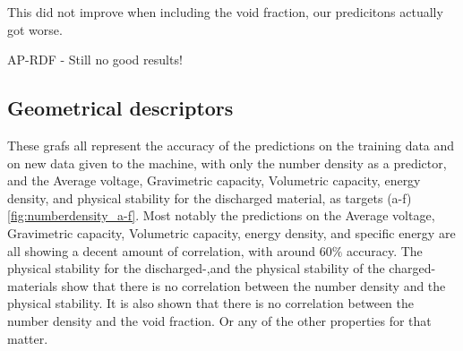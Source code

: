 This did not improve when including the void fraction, our predicitons actually got worse.   

AP-RDF - Still no good results! 


\subsection{Geometrical descriptors}
These grafs all represent the accuracy of the predictions on the training data and on new data given to the machine, with only the number density as a predictor, and the Average voltage, Gravimetric capacity, Volumetric capacity, energy density, and physical stability for the discharged material, as targets (a-f)\ref{fig:numberdensity_a-f}. Most notably the predictions on the Average voltage, Gravimetric capacity, Volumetric capacity, energy density, and specific energy are all showing a decent amount of correlation, with around $60\%$ accuracy. 
The physical stability for the discharged-,and the physical stability of the charged-materials show that there is no correlation between the number density and the physical stability. 
It is also shown that there is no correlation between the number density and the void fraction. Or any of the other properties for that matter. 


